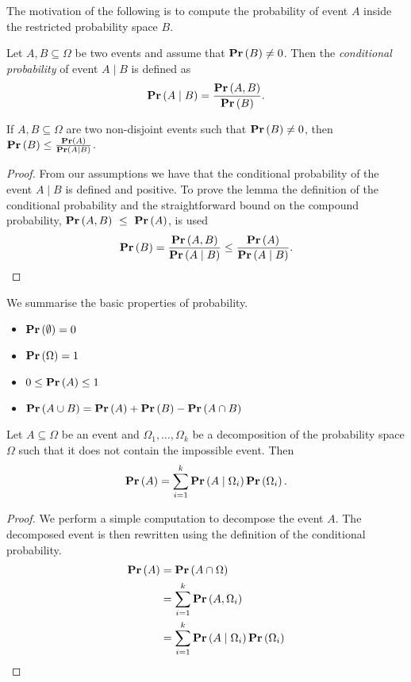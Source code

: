 The motivation of the following is to compute the probability of event $A$ inside the restricted probability space $B$.
\begin{definition}
Let $A, B \subseteq \Omega$ be two events and assume that $\mathbf{Pr}\left(B\right) \neq 0$. Then the \emph{conditional probability} of event $A \mid B$ is defined as
\[
\mathbf{Pr}\left(A \mid B\right) = \frac{\mathbf{Pr}\left(A, B\right)}{\mathbf{Pr}\left(B\right)} \text{.}
\]
\end{definition}

\begin{lemma}
\label{lemma-conditional-probability-event-estimate}
If $A, B \subseteq \Omega$ are two non-disjoint events such that $\mathbf{Pr}\left(B\right) \neq 0$, then $\mathbf{Pr}\left(B\right) \leq \frac{\mathbf{Pr}\left(A\right)}{\mathbf{Pr}\left(A \mid B\right)}$.
\end{lemma}
\begin{proof}
From our assumptions we have that the conditional probability of the event $A \mid B$ is defined and positive. To prove the lemma the definition of the conditional probability and the straightforward bound on the compound probability, $\mathbf{Pr}\left(A, B\right)~\leq~\mathbf{Pr}\left(A\right)$, is used
\[
\mathbf{Pr}\left(B\right) = \frac{\mathbf{Pr}\left(A, B\right)}{\mathbf{Pr}\left(A \mid B\right)} \leq \frac{\mathbf{Pr}\left(A\right)}{\mathbf{Pr}\left(A \mid B\right)} \text{.}
\]
\end{proof}

We summarise the basic properties of probability.
\begin{itemize}
\item $\mathbf{Pr}\left(\emptyset\right) = 0$
\item $\mathbf{Pr}\left(\Omega\right) = 1$
\item $0 \leq \mathbf{Pr}\left(A\right) \leq 1$
\item $\mathbf{Pr}\left(A \cup B\right) = \mathbf{Pr}\left(A\right) + \mathbf{Pr}\left(B\right) - \mathbf{Pr}\left(A \cap B\right)$
\end{itemize}

\begin{theorem}
\label{theorem-law-of-total-probability}
Let $A \subseteq \Omega$ be an event and $\Omega_1, \dots, \Omega_k$ be a decomposition of the probability space $\Omega$ such that it does not contain the impossible event. Then
\[
\mathbf{Pr}\left(A\right) = \displaystyle\sum_{i = 1}^{k} \mathbf{Pr}\left(A \mid \Omega_i\right) \mathbf{Pr}\left(\Omega_i\right) \text{.}
\]
\end{theorem}
\begin{proof}
We perform a simple computation to decompose the event $A$. The decomposed event is then rewritten using the definition of the conditional probability.
\[
\begin{split}
\mathbf{Pr}\left(A\right)
	& = \mathbf{Pr}\left(A \cap \Omega\right) \\
	& = \displaystyle\sum_{i = 1}^{k} \mathbf{Pr}\left(A, \Omega_i\right) \\
	& = \displaystyle\sum_{i = 1}^{k} \mathbf{Pr}\left(A \mid \Omega_i\right) \mathbf{Pr}\left(\Omega_i\right) \\
\end{split}
\]
\end{proof}

